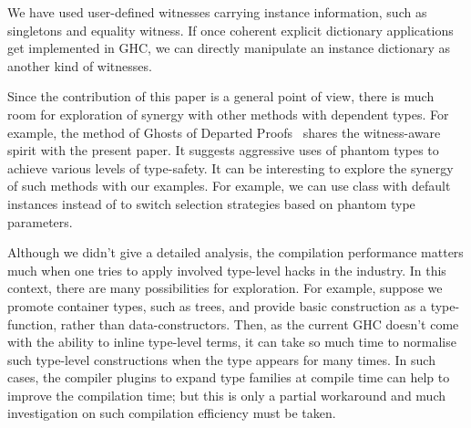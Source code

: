 \documentclass[demotion-paper.tex]{subfiles}
\begin{document}
We have used user-defined witnesses carrying instance information, such as singletons and equality witness.
If once coherent explicit dictionary applications~\cite{Winant:2018wu} get implemented in GHC, we can directly manipulate an instance dictionary as another kind of witnesses.

Since the contribution of this paper is a general point of view, there is much room for exploration of synergy with other methods with dependent types.
For example, the method of Ghosts of Departed Proofs~\cite{Noonan:2018aa} shares the witness-aware spirit with the present paper.
It suggests aggressive uses of phantom types to achieve various levels of type-safety.
It can be interesting to explore the synergy of such methods with our examples.
For example, we can use  class with default instances instead of  to switch selection strategies based on phantom type parameters.

Although we didn't give a detailed analysis, the compilation performance matters much when one tries to apply involved type-level hacks in the industry.
In this context, there are many possibilities for exploration.
For example, suppose we promote container types, such as trees, and provide basic construction as a type-function, rather than data-constructors.
Then, as the current GHC doesn't come with the ability to inline type-level terms, it can take so much time to normalise such type-level constructions when the type appears for many times.
In such cases, the compiler plugins to expand type families at compile time can help to improve the compilation time; but this is only a partial workaround and much investigation on such compilation efficiency must be taken.
\end{document}
